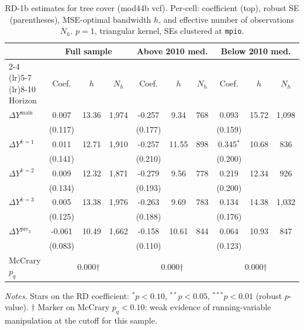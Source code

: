 \documentclass[11pt]{article}
\begin{document}
\begin{table}[H]
\centering
\scriptsize
\caption{RD-1b estimates for tree cover (mod44b vcf). Per-cell: coefficient
(top), robust SE (parentheses), MSE-optimal bandwidth $h$, and
effective number of observations $N_h$. $p=1$, triangular kernel,
SEs clustered at \texttt{mpio}.}
\label{tab:rdplot_rd1b_tree_cover}
\begin{tabular}{l ccc ccc ccc}
\toprule
 & \multicolumn{3}{c}{Full sample} & \multicolumn{3}{c}{Above 2010 med.} & \multicolumn{3}{c}{Below 2010 med.} \\
\cmidrule(lr){2-4} \cmidrule(lr){5-7} \cmidrule(lr){8-10}
Horizon & Coef. & $h$ & $N_h$ & Coef. & $h$ & $N_h$ & Coef. & $h$ & $N_h$ \\
\midrule
$\Delta Y^{\text{main}}$ & 0.007 & 13.36 & 1,974 & -0.257 & 9.34 & 768 & 0.093 & 15.72 & 1,098 \\
 & (0.117) &  &  & (0.177) &  &  & (0.159) &  &  \\
\addlinespace[1pt]
$\Delta Y^{k=1}$ & 0.011 & 12.71 & 1,910 & -0.257 & 11.55 & 898 & 0.345$^{*}$ & 10.68 & 836 \\
 & (0.141) &  &  & (0.210) &  &  & (0.200) &  &  \\
\addlinespace[1pt]
$\Delta Y^{k=2}$ & 0.009 & 12.32 & 1,871 & -0.279 & 9.56 & 778 & 0.219 & 12.34 & 926 \\
 & (0.134) &  &  & (0.193) &  &  & (0.200) &  &  \\
\addlinespace[1pt]
$\Delta Y^{k=3}$ & 0.005 & 13.38 & 1,976 & -0.263 & 9.69 & 783 & 0.134 & 14.38 & 1,032 \\
 & (0.125) &  &  & (0.188) &  &  & (0.176) &  &  \\
\addlinespace[1pt]
$\Delta Y^{\text{pre}_3}$ & -0.061 & 10.49 & 1,662 & -0.158 & 10.61 & 844 & 0.064 & 10.93 & 847 \\
 & (0.083) &  &  & (0.110) &  &  & (0.123) &  &  \\
\addlinespace[1pt]
\midrule
McCrary $p_q$ & \multicolumn{3}{c}{0.000$\dagger$} & \multicolumn{3}{c}{0.000$\dagger$} & \multicolumn{3}{c}{0.000$\dagger$} \\
\bottomrule
\end{tabular}
\begin{flushleft}\footnotesize
\textit{Notes.} Stars on the RD coefficient: $^{*}p<0.10$,
$^{**}p<0.05$, $^{***}p<0.01$ (robust $p$-value).
$\dagger$ Marker on McCrary $p_q<0.10$: weak evidence of running-variable manipulation at the cutoff for this sample.\\
\end{flushleft}
\end{table}
\end{document}
